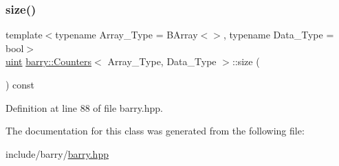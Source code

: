 \mbox{\label{classbarry_1_1_counters_aa70f3d91d0f69ff8f4887930efaa0411}} 
\subsubsection{\texorpdfstring{size()}{size()}}
{\footnotesize\ttfamily template$<$typename Array\+\_\+\+Type = B\+Array$<$$>$, typename Data\+\_\+\+Type = bool$>$ \\
\hyperlink{namespacebarry_a11dfc53ddb4672278319aa04f1e09a6c}{uint} \hyperlink{classbarry_1_1_counters}{barry\+::\+Counters}$<$ Array\+\_\+\+Type, Data\+\_\+\+Type $>$\+::size (\begin{DoxyParamCaption}{ }\end{DoxyParamCaption}) const\hspace{0.3cm}{\ttfamily [inline]}}



Definition at line 88 of file barry.\+hpp.



The documentation for this class was generated from the following file\+:\begin{DoxyCompactItemize}
\item 
include/barry/\hyperlink{barry_8hpp}{barry.\+hpp}\end{DoxyCompactItemize}
